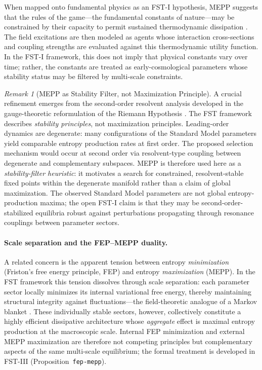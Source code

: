 \documentclass[12pt,a4paper]{article}
\theoremstyle{remark}
\newtheorem{remark}{Remark}
\begin{document}
When mapped onto fundamental physics as an FST-I hypothesis, MEPP suggests that the rules of the game---the fundamental constants of nature---may be constrained by their capacity to permit sustained thermodynamic dissipation \citep{EntropyMaximum}. The field excitations are then modeled as agents whose interaction cross-sections and coupling strengths are evaluated against this thermodynamic utility function. In the FST-I framework, this does not imply that physical constants vary over time; rather, the constants are treated as early-cosmological parameters whose stability status may be filtered by multi-scale constraints.

\begin{remark}[MEPP as Stability Filter, not Maximization Principle]
\label{rem:mepp-stability-filter}
A crucial refinement emerges from the second-order resolvent analysis developed in the gauge-theoretic reformulation of the Riemann Hypothesis \citep{GeigerRH2026b}. The FST framework describes \emph{stability principles}, not maximization principles. Leading-order dynamics are degenerate: many configurations of the Standard Model parameters yield comparable entropy production rates at first order. The proposed selection mechanism would occur at second order via resolvent-type coupling between degenerate and complementary subspaces. MEPP is therefore used here as a \emph{stability-filter heuristic}: it motivates a search for constrained, resolvent-stable fixed points within the degenerate manifold rather than a claim of global maximization. The observed Standard Model parameters are not global entropy-production maxima; the open FST-I claim is that they may be second-order-stabilized equilibria robust against perturbations propagating through resonance couplings between parameter sectors.
\end{remark}

\paragraph{Scale separation and the FEP--MEPP duality.}
A related concern is the apparent tension between entropy \emph{minimization} (Friston's free energy principle, FEP) and entropy \emph{maximization} (MEPP). In the FST framework this tension dissolves through scale separation: each parameter sector locally minimizes its internal variational free energy, thereby maintaining structural integrity against fluctuations---the field-theoretic analogue of a Markov blanket \citep{Friston2010}. These individually stable sectors, however, collectively constitute a highly efficient dissipative architecture whose \emph{aggregate} effect is maximal entropy production at the macroscopic scale. Internal FEP minimization and external MEPP maximization are therefore not competing principles but complementary aspects of the same multi-scale equilibrium; the formal treatment is developed in FST-III (Proposition~\texttt{fep-mepp}).
\end{document}

